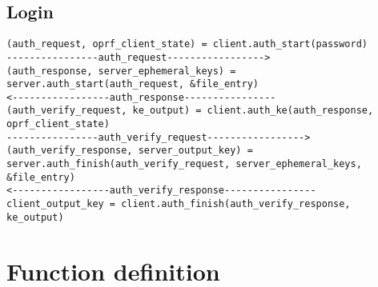 \documentclass[../report.tex]{subfiles}
\begin{document}
\subsection{Login}
\begin{verbatim}
(auth_request, oprf_client_state) = client.auth_start(password)
----------------auth_request----------------->
(auth_response, server_ephemeral_keys) = server.auth_start(auth_request, &file_entry)
<-----------------auth_response----------------
(auth_verify_request, ke_output) = client.auth_ke(auth_response, oprf_client_state)
----------------auth_verify_request----------------->
(auth_verify_response, server_output_key) = server.auth_finish(auth_verify_request, server_ephemeral_keys, &file_entry)
<-----------------auth_verify_response----------------
client_output_key = client.auth_finish(auth_verify_response, ke_output)
\end{verbatim}

\section{Function definition}
\end{document}
